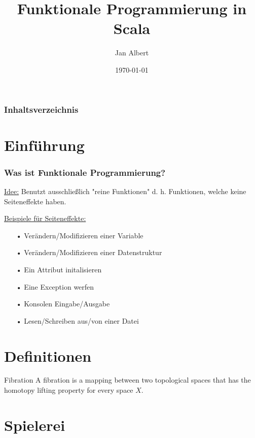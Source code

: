 \documentclass[12pt,utf8]{beamer}
\author{Jan Albert}
\title{Funktionale Programmierung in Scala}
\date{\today}
\begin{document}
	\begin{frame}
		\titlepage
	\end{frame}
	
	\begin{frame}
		\frametitle{Inhaltsverzeichnis}
		\tableofcontents
	\end{frame}
	
	\section[Section]{Einführung}
		\begin{frame}
			\frametitle{Was ist Funktionale Programmierung?}
			\begin{flushleft}
				\underline{Idee:}
				Benutzt ausschließlich "reine Funktionen" d. h. 	  Funktionen, welche keine Seiteneffekte haben. \newline
				
				\underline{Beispiele für Seiteneffekte:}
				\begin{itemize}
				\item[•] Verändern/Modifizieren einer Variable
				\item[•] Verändern/Modifizieren einer Datenstruktur
				\item[•] Ein Attribut initalisieren
				\item[•] Eine Exception werfen
				\item[•] Konsolen Eingabe/Ausgabe
				\item[•] Lesen/Schreiben aus/von einer Datei
				\end{itemize}
			\end{flushleft}
		\end{frame}
		
	\section[Section]{Definitionen}
		\theoremstyle{definition}
\begin{definition}{Fibration}
A fibration is a mapping between two topological spaces that has the homotopy lifting property for every space $X$.
\end{definition}

	
	\section[Section]{Spielerei}
\end{document}
